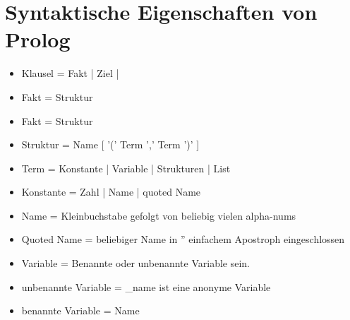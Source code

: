 \documentclass{article}
\begin{document}
\section*{Syntaktische Eigenschaften von Prolog}
    \begin{itemize}
        \item Klausel = Fakt | Ziel |
        \item Fakt = Struktur
        \item Fakt = Struktur
        \item Struktur = Name [ ’(’ Term {’,’ Term} ’)’ ]
        \item Term = Konstante | Variable | Strukturen | List
        \item Konstante = Zahl | Name | quoted Name
        \item Name = Kleinbuchstabe gefolgt von beliebig vielen alpha-nums
        \item Quoted Name = beliebiger Name in '' einfachem Apostroph eingeschlossen
        \item Variable = Benannte oder unbenannte Variable sein.
        \item unbenannte Variable = \_name ist eine anonyme Variable
        \item benannte Variable = Name 
    \end{itemize}
\end{document}
